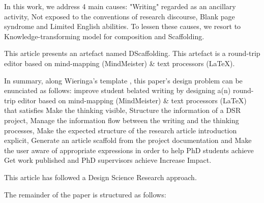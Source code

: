 \documentclass{article}
\begin{document}
In this work, we address 4 main causes: "Writing" regarded as an ancillary activity, Not exposed to the conventions of research discourse, Blank page syndrome and Limited English abilities. To lessen these causes, we resort to Knowledge-transforming model for composition and Scaffolding. 
    
This article presents an artefact named DScaffolding. This artefact is a round-trip editor based on mind-mapping (MindMeister) & text processors (LaTeX). 
    
In summary, along Wieringa's template \cite{Wieringa2014}, this paper's design problem can be enunciated as follows: 
improve student belated writing
by designing a(n) round-trip editor based on mind-mapping (MindMeister) & text processors (LaTeX)
that satisfies Make the thinking visible, Structure the information of a DSR project, Manage the information flow between the writing and the thinking processes, Make the expected structure of the research article introduction explicit, Generate an article scaffold from the project documentation and Make the user aware of appropriate expressions
in order to help PhD students achieve Get work published and PhD supervisors achieve Increase Impact. 
    

      
This article has followed a Design Science Research approach.

The remainder of the paper is structured as follows: 

    
      


\end{document}

